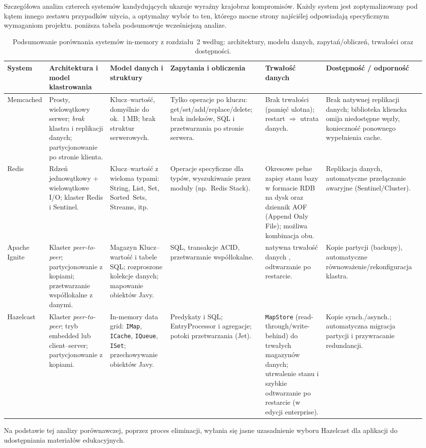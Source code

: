 Szczegółowa analiza czterech systemów kandydujących ukazuje wyraźny krajobraz kompromisów. Każdy system jest zoptymalizowany pod kątem innego zestawu przypadków użycia, a optymalny wybór to ten, którego mocne strony najściślej odpowiadają specyficznym wymaganiom projektu. poniższa tabela podsumowuje wcześniejszą analize. 
\begin{table}[htbp]
\centering
\footnotesize
\setlength{\tabcolsep}{3pt}
\renewcommand{\arraystretch}{1.15}
\begin{tabular}{p{2.6cm}p{2.6cm}p{2.6cm}p{2.6cm}p{2.6cm}p{2.6cm}}
\hline
\textbf{System} & \textbf{Architektura i model klastrowania} & \textbf{Model danych i struktury} & \textbf{Zapytania i obliczenia} & \textbf{Trwałość danych} & \textbf{Dostępność / odporność} \\
\hline
Memcached & Prosty, wielowątkowy serwer; \emph{brak} klastra i replikacji danych; partycjonowanie po stronie klienta. & Klucz--wartość, domyślnie do ok.\ 1\,MB; brak struktur serwerowych. & Tylko operacje po kluczu: get/set/add/replace/delete; brak indeksów, SQL i przetwarzania po stronie serwera. & Brak trwałości (pamięć ulotna); restart $\Rightarrow$ utrata danych. & Brak natywnej replikacji danych; biblioteka kliencka omija niedostępne węzły, konieczność ponownego wypełnienia cache. \\
\hline
Redis & Rdzeń jednowątkowy + wielowątkowe I/O; klaster Redis i Sentinel. & Klucz--wartość z wieloma typami: String, List, Set, Sorted~Sets, Streams, itp. & Operacje specyficzne dla typów, wyszukiwanie przez moduły (np.\ Redis Stack). & Okresowe pełne zapisy stanu bazy w formacie RDB na dysk oraz dziennik AOF (Append Only File); możliwa kombinacja obu. & Replikacja danych, automatyczne przełączanie awaryjne (Sentinel/Cluster). \\
\hline
Apache Ignite & Klaster \emph{peer-to-peer}; partycjonowanie z kopiami; przetwarzanie współlokalne z danymi. & Magazyn Klucz--wartość i tabele SQL; rozproszone kolekcje danych; mapowanie obiektów Javy. & SQL, transakcje ACID, przetwarzanie współlokalne. & natywna trwałość danych , odtwarzanie po restarcie. & Kopie partycji (backupy), automatyczne równoważenie/rekonfiguracja klastra. \\
\hline
Hazelcast & Klaster \emph{peer-to-peer}; tryb embedded lub client--server; partycjonowanie z kopiami. & In-memory data grid: \texttt{IMap}, \texttt{ICache}, \texttt{IQueue}, \texttt{ISet}; przechowywanie obiektów Javy. & Predykaty i SQL; EntryProcessor i agregacje; potoki przetwarzania (Jet). & \texttt{MapStore} (read-through/write-behind) do trwałych magazynów danych; utrwalenie stanu i szybkie odtwarzanie po restarcie (w edycji enterprise). & Kopie synch./asynch.; automatyczna migracja partycji i przywracanie redundancji. \\
\hline
\end{tabular}
\caption{Podsumowanie porównania systemów in-memory z rozdziału~2 według: architektury, modelu danych, zapytań/obliczeń, trwałości oraz dostępności.}
\label{tab:inmem-summary-r2}
\end{table}
\FloatBarrier
Na podstawie tej analizy porównawczej, poprzez proces eliminacji, wyłania się jasne uzasadnienie wyboru Hazelcast dla aplikacji do udostępniania materiałów edukacyjnych.

